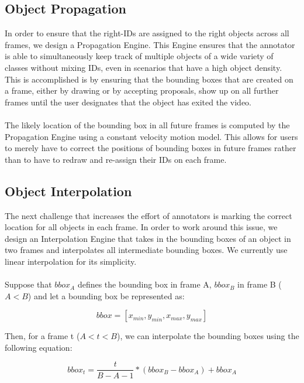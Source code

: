 \subsection{Object Propagation}
In order to ensure that the right-IDs are assigned to the right objects across all frames, we design a Propagation Engine. This Engine ensures that the annotator is able to simultaneously keep track of multiple objects of a wide variety of classes without mixing IDs, even in scenarios that have a high object density. This is accomplished is by ensuring that the bounding boxes that are created on a frame, either by drawing or by accepting proposals, show up on all further frames until the user designates that the object has exited the video.
\paragraph{}The likely location of the bounding box in all future frames is computed by the Propagation Engine using a constant velocity motion model. This allows for users to merely have to correct the positions of bounding boxes in future frames rather than to have to redraw and re-assign their IDs on each frame. 

\subsection{Object Interpolation}
The next challenge that increases the effort of annotators is marking the correct location for all objects in each frame. In order to work around this issue, we design an Interpolation Engine that takes in the bounding boxes of an object in two frames and interpolates all intermediate bounding boxes. We currently use linear interpolation for its simplicity. 
\paragraph{}Suppose that $bbox_{A}$ defines the bounding box in frame A, $bbox_{B}$ in frame B ($A<B$) and let a bounding box be represented as:

\begin{equation}
bbox = [x_{min}, y_{min}, x_{max}, y_{max}]
\end{equation}

Then, for a frame t ($A<t<B$), we can interpolate the bounding boxes using the following equation:

\begin{equation}
bbox_t = \frac{t}{B - A - 1} * (bbox_B - bbox_A) + bbox_A
\end{equation}


